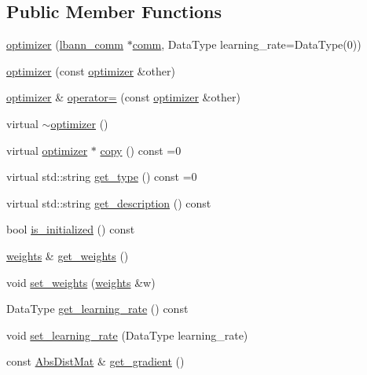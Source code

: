 \subsection*{Public Member Functions}
\begin{DoxyCompactItemize}
\item 
\hyperlink{classlbann_1_1optimizer_a136ed79c3f279ecded5be380fb67b05f}{optimizer} (\hyperlink{classlbann_1_1lbann__comm}{lbann\+\_\+comm} $\ast$\hyperlink{file__io_8cpp_ab048c6f9fcbcfaa57ce68b00263dbebe}{comm}, Data\+Type learning\+\_\+rate=Data\+Type(0))
\item 
\hyperlink{classlbann_1_1optimizer_a300aa4928e2e4feeb5e99b9eb0a16632}{optimizer} (const \hyperlink{classlbann_1_1optimizer}{optimizer} \&other)
\item 
\hyperlink{classlbann_1_1optimizer}{optimizer} \& \hyperlink{classlbann_1_1optimizer_ab7811e0a4d2d9b594140aed78b6de743}{operator=} (const \hyperlink{classlbann_1_1optimizer}{optimizer} \&other)
\item 
virtual \hyperlink{classlbann_1_1optimizer_abbee0e2cb021f835b669d9ba0da5145a}{$\sim$optimizer} ()
\item 
virtual \hyperlink{classlbann_1_1optimizer}{optimizer} $\ast$ \hyperlink{classlbann_1_1optimizer_adf19a1d19d832ebfe70072cc202cdf39}{copy} () const =0
\item 
virtual std\+::string \hyperlink{classlbann_1_1optimizer_a7b7a6814e14eeee157e1cbb7f15dd4ff}{get\+\_\+type} () const =0
\item 
virtual std\+::string \hyperlink{classlbann_1_1optimizer_a66bb8d28dfb41452ac1a75a3efd47723}{get\+\_\+description} () const
\item 
bool \hyperlink{classlbann_1_1optimizer_abccf0babf69e3d7c6e9a7fd0731c79b7}{is\+\_\+initialized} () const
\item 
\hyperlink{classlbann_1_1weights}{weights} \& \hyperlink{classlbann_1_1optimizer_a9c3fc3f1d45da822676d5932a1c7af82}{get\+\_\+weights} ()
\item 
void \hyperlink{classlbann_1_1optimizer_afc00daf2acb6af7e29786524126660c2}{set\+\_\+weights} (\hyperlink{classlbann_1_1weights}{weights} \&w)
\item 
Data\+Type \hyperlink{classlbann_1_1optimizer_ac52867427b0d28ec6888b6344104791d}{get\+\_\+learning\+\_\+rate} () const
\item 
void \hyperlink{classlbann_1_1optimizer_a147cac09beaa17df4e0fc1fc1be3abce}{set\+\_\+learning\+\_\+rate} (Data\+Type learning\+\_\+rate)
\item 
const \hyperlink{base_8hpp_a9a697a504ae84010e7439ffec862b470}{Abs\+Dist\+Mat} \& \hyperlink{classlbann_1_1optimizer_a12b7dbc72eb2de78d6ad798b8939f349}{get\+\_\+gradient} ()

\end{DoxyCompactItemize}
